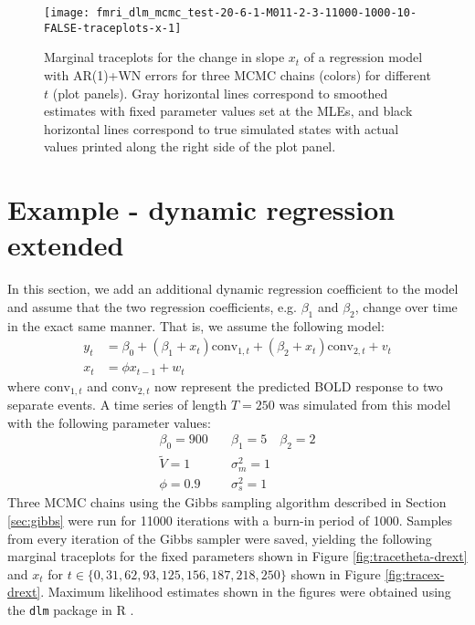\documentclass{article}
\begin{document}
\begin{figure}[ht]
\texttt{[image: fmri\_dlm\_mcmc\_test-20-6-1-M011-2-3-11000-1000-10-FALSE-traceplots-x-1]}
\caption{Marginal traceplots for the change in slope $x_t$ of a regression model with AR(1)+WN errors for three MCMC chains (colors) for different $t$ (plot panels). Gray horizontal lines correspond to smoothed estimates with fixed parameter values set at the MLEs, and black horizontal lines correspond to true simulated states with actual values printed along the right side of the plot panel.} \label{fig:tracex-arwn}
\end{figure}

\clearpage

\section{Example - dynamic regression extended} \label{sec:drext}

In this section, we add an additional dynamic regression coefficient to the model and assume that the two regression coefficients, e.g. $\beta_1$ and $\beta_2$, change over time in the exact same manner. That is, we assume the following model:
\begin{align*}
y_t &= \beta_0 + (\beta_1 + x_t)\mbox{conv}_{1,t} + (\beta_2 + x_t)\mbox{conv}_{2,t} + v_t \\
x_t &= \phi x_{t-1} + w_t
\end{align*}
\noindent where $\mbox{conv}_{1,t}$ and $\mbox{conv}_{2,t}$ now represent the predicted BOLD response to two separate events. A time series of length $T = 250$ was simulated from this model with the following parameter values:
\begin{align*}
\beta_0 = 900 &\quad \beta_1 = 5 \quad \beta_2 = 2 \\
\tilde{V} = 1 &\quad \sigma_m^2 = 1 \\
\phi = 0.9 &\quad \sigma_s^2 = 1
\end{align*}
Three MCMC chains using the Gibbs sampling algorithm described in Section \ref{sec:gibbs} were run for 11000 iterations with a burn-in period of 1000. Samples from every iteration of the Gibbs sampler were saved, yielding the following marginal traceplots for the fixed parameters shown in Figure \ref{fig:tracetheta-drext} and $x_t$ for $t \in \{0, 31, 62, 93, 125, 156, 187, 218, 250\}$ shown in Figure \ref{fig:tracex-drext}. Maximum likelihood estimates shown in the figures were obtained using the {\tt dlm} package in R \citep{petris2009dynamic}.
\end{document}

